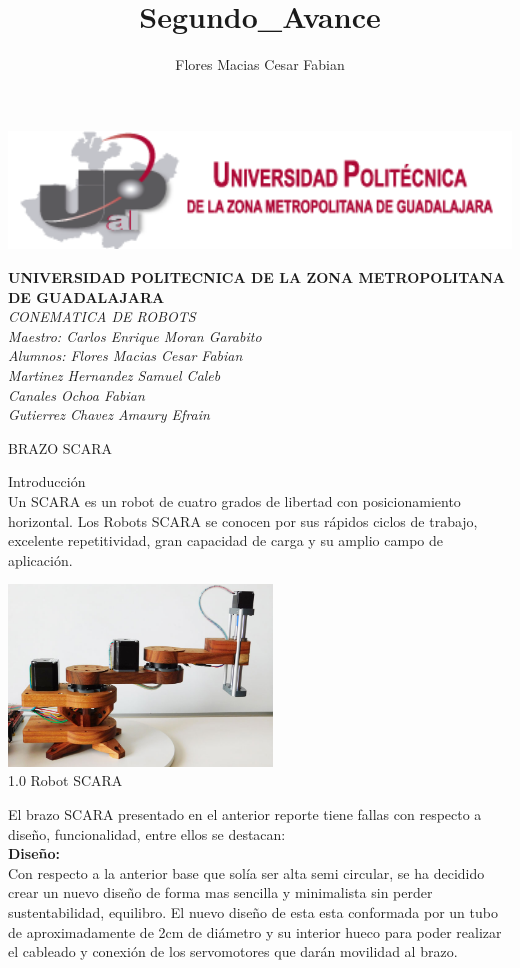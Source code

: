 \documentclass[12pt,a4paper]{article}
\author{Flores Macias Cesar Fabian}
\title{Segundo_Avance}
\begin{document}
\begin{center}
\includegraphics[width=16cm]{Imagenes/logo.png}  \\
\end{center}
\textbf{UNIVERSIDAD POLITECNICA DE LA ZONA METROPOLITANA DE GUADALAJARA}\\
\textit{CONEMATICA DE ROBOTS}\\
\textit{Maestro: Carlos Enrique Moran Garabito}\\
\textit{Alumnos: Flores Macias Cesar Fabian\\
Martinez Hernandez Samuel Caleb\\
Canales Ochoa Fabian\\
Gutierrez Chavez Amaury Efrain}\\
\begin{center}
BRAZO SCARA
\end{center}
Introducción\\
Un SCARA es un robot de cuatro grados de libertad con posicionamiento horizontal. Los Robots SCARA se conocen por sus rápidos ciclos de trabajo, excelente repetitividad, gran capacidad de carga y su amplio campo de aplicación.\\
\begin{center}
\includegraphics[width=7cm]{Imagenes/SC.jpg}\\1.0 Robot SCARA
\end{center}
El brazo SCARA presentado en el anterior reporte tiene fallas con respecto a diseño, funcionalidad, entre ellos se destacan: \\
\textbf{Diseño:}\\
Con respecto a la anterior base que solía ser alta semi circular, se ha decidido crear un nuevo diseño de forma mas sencilla y minimalista sin perder sustentabilidad, equilibro. El nuevo diseño de esta esta conformada por un tubo de aproximadamente de 2cm de diámetro y su interior hueco para poder realizar el cableado y conexión de los servomotores que darán movilidad al brazo.\\
\end{document}
